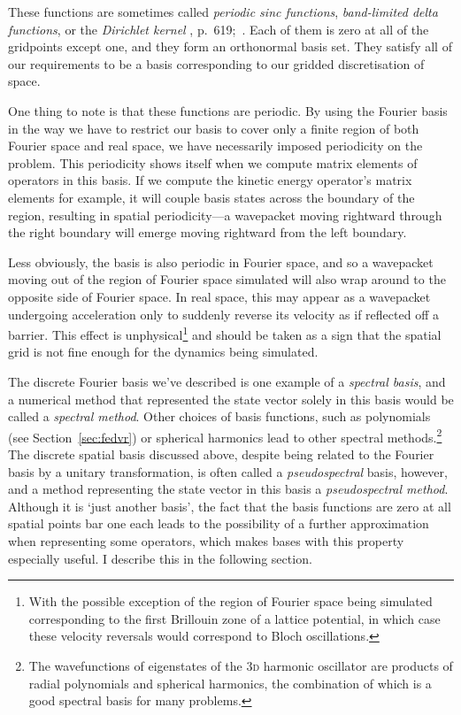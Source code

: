 These functions are sometimes called \emph{periodic sinc functions}, \emph{band-limited delta functions}, or the \emph{Dirichlet kernel}
\citeleft{}, p.~619;~\citeright.
Each of them is zero at all of the gridpoints except one, and they form an orthonormal basis set. They satisfy all of our requirements to be a basis corresponding to our gridded discretisation of space.

One thing to note is that these functions are periodic. By using the Fourier basis in the way we have to restrict our basis to cover only a finite region of both Fourier space and real space, we have necessarily imposed periodicity on the problem. This periodicity shows itself when we compute matrix elements of operators in this basis. If we compute the kinetic energy operator's matrix elements for example, it will couple basis states across the boundary of the region, resulting in spatial periodicity---a wavepacket moving rightward through the right boundary will emerge moving rightward from the left boundary.

Less obviously, the basis is also periodic in Fourier space, and so a wavepacket moving out of the region of Fourier space simulated will also wrap around to the opposite side of Fourier space. In real space, this may appear as a wavepacket undergoing acceleration only to suddenly reverse its velocity as if reflected off a barrier. This effect is unphysical\footnote{With the possible exception of the region of Fourier space being simulated corresponding to the first Brillouin zone of a lattice potential, in which case these velocity reversals would correspond to Bloch oscillations.} and should be taken as a sign that the spatial grid is not fine enough for the dynamics being simulated.

The discrete Fourier basis we've described is one example of a \emph{spectral basis}, and a numerical method that represented the state vector solely in this basis would be called a \emph{spectral method}. Other choices of basis functions, such as polynomials (see Section~\ref{sec:fedvr}) or spherical harmonics lead to other spectral methods.\footnote{The wavefunctions of eigenstates of the \textsc{3d} harmonic oscillator are products of radial polynomials and spherical harmonics, the combination of which is a good spectral basis for many problems.} The discrete spatial basis discussed above, despite being related to the Fourier basis by a unitary transformation, is often called a \emph{pseudospectral} basis, however, and a method representing the state vector in this basis a \emph{pseudospectral method}. Although it is `just another basis', the fact that the basis functions are zero at all spatial points bar one each leads to the possibility of a further approximation when representing some operators, which makes bases with this property especially useful. I describe this in the following section.

